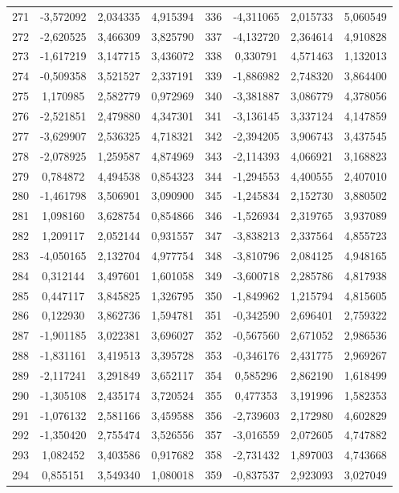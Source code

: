 \begin{apendicesenv}
\begin{table}[H]
\begin{tabular}{c c c c c c c c}
		271 & -3,572092 & 2,034335 & 4,915394 & 336 & -4,311065 & 2,015733 & 5,060549 \\
		272 & -2,620525 & 3,466309 & 3,825790 & 337 & -4,132720 & 2,364614 & 4,910828 \\
		273 & -1,617219 & 3,147715 & 3,436072 & 338 & 0,330791 & 4,571463 & 1,132013 \\
		274 & -0,509358 & 3,521527 & 2,337191 & 339 & -1,886982 & 2,748320 & 3,864400 \\
		275 & 1,170985 & 2,582779 & 0,972969 & 340 & -3,381887 & 3,086779 & 4,378056 \\
		276 & -2,521851 & 2,479880 & 4,347301 & 341 & -3,136145 & 3,337124 & 4,147859 \\
		277 & -3,629907 & 2,536325 & 4,718321 & 342 & -2,394205 & 3,906743 & 3,437545 \\
		278 & -2,078925 & 1,259587 & 4,874969 & 343 & -2,114393 & 4,066921 & 3,168823 \\
		279 & 0,784872 & 4,494538 & 0,854323 & 344 & -1,294553 & 4,400555 & 2,407010 \\
		280 & -1,461798 & 3,506901 & 3,090900 & 345 & -1,245834 & 2,152730 & 3,880502 \\
		281 & 1,098160 & 3,628754 & 0,854866 & 346 & -1,526934 & 2,319765 & 3,937089 \\
		282 & 1,209117 & 2,052144 & 0,931557 & 347 & -3,838213 & 2,337564 & 4,855723 \\
		283 & -4,050165 & 2,132704 & 4,977754 & 348 & -3,810796 & 2,084125 & 4,948165 \\
		284 & 0,312144 & 3,497601 & 1,601058 & 349 & -3,600718 & 2,285786 & 4,817938 \\
		285 & 0,447117 & 3,845825 & 1,326795 & 350 & -1,849962 & 1,215794 & 4,815605 \\
		286 & 0,122930 & 3,862736 & 1,594781 & 351 & -0,342590 & 2,696401 & 2,759322 \\
		287 & -1,901185 & 3,022381 & 3,696027 & 352 & -0,567560 & 2,671052 & 2,986536 \\
		288 & -1,831161 & 3,419513 & 3,395728 & 353 & -0,346176 & 2,431775 & 2,969267 \\
		289 & -2,117241 & 3,291849 & 3,652117 & 354 & 0,585296 & 2,862190 & 1,618499 \\
		290 & -1,305108 & 2,435174 & 3,720524 & 355 & 0,477353 & 3,191996 & 1,582353 \\
		291 & -1,076132 & 2,581166 & 3,459588 & 356 & -2,739603 & 2,172980 & 4,602829 \\
		292 & -1,350420 & 2,755474 & 3,526556 & 357 & -3,016559 & 2,072605 & 4,747882 \\
		293 & 1,082452 & 3,403586 & 0,917682 & 358 & -2,731432 & 1,897003 & 4,743668 \\
		294 & 0,855151 & 3,549340 & 1,080018 & 359 & -0,837537 & 2,923093 & 3,027049 \\
		\bottomrule
	\end{tabular}
\end{table}


\end{apendicesenv}
